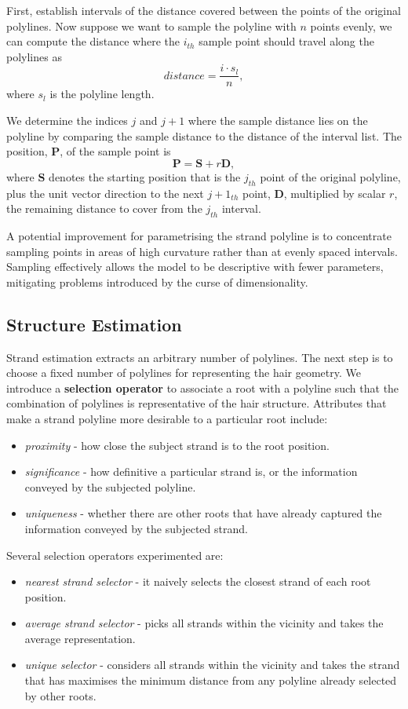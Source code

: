 \documentclass[ %
author={Dillon Keith Diep},
supervisor={Dr. Carl Henrik Ek},
degree={MEng},
title={ART-CG Hair:},
subtitle={Assisted Real-time Content Generation of Stylised Virtual Hair},
type={Research},
year={2017} ]{dissertation}
\begin{document}
First, establish intervals of the distance covered between the points of the original polylines. Now suppose we want to sample the polyline with $n$ points evenly, we can compute the distance where the $i_{th}$ sample point should travel along the polylines as
$$distance=\frac{i \cdot s_l}{n},$$
where $s_l$ is the polyline length.

We determine the indices $j$ and $j+1$ where the sample distance lies on the polyline by comparing the sample distance to the distance of the interval list. The position, $\bm{P}$, of the sample point is
$$\bm{P} = \bm{S} + r\bm{D},$$
where $\bm{S}$ denotes the starting position that is the $j_{th}$ point of the original polyline, plus the unit vector direction to the next $j+1_{th}$ point, $\bm{D}$, multiplied by scalar $r$, the remaining distance to cover from the $j_{th}$ interval.

A potential improvement for parametrising the strand polyline is to concentrate sampling points in areas of high curvature rather than at evenly spaced intervals. Sampling effectively allows the model to be descriptive with fewer parameters, mitigating problems introduced by the curse of dimensionality.

\subsection{Structure Estimation}
Strand estimation extracts an arbitrary number of polylines. The next step is to choose a fixed number of polylines for representing the hair geometry. We introduce a \textbf{selection operator} to associate a root with a polyline such that the combination of polylines is representative of the hair structure. Attributes that make a strand polyline more desirable to a particular root include:
\begin{itemize}
	\item \textit{proximity} - how close the subject strand is to the root position.
	\item \textit{significance} - how definitive a particular strand is, or the information conveyed by the subjected polyline.
	\item \textit{uniqueness} - whether there are other roots that have already captured the information conveyed by the subjected strand.
\end{itemize}
Several selection operators experimented are:
\begin{itemize}
	\item \textit{nearest strand selector} - it naively selects the closest strand of each root position. 
	\item \textit{average strand selector} - picks all strands within the vicinity and takes the average representation.
	\item \textit{unique selector} - considers all strands within the vicinity and takes the strand that has maximises the minimum distance from any polyline already selected by other roots.
\end{itemize}
\end{document}
